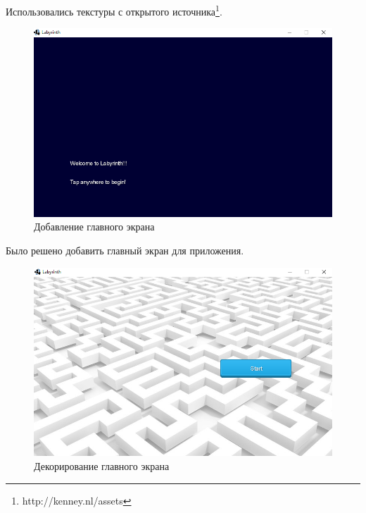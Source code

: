 Использовались текстуры с открытого источника\footnote{http://kenney.nl/assets}. 

\begin{figure}[H]
	\begin{center}
		\includegraphics[scale=0.7]{pics/04.png}
		\caption{Добавление главного экрана} 
		\label{pic:pic_name} %
	\end{center}
\end{figure}

Было решено добавить главный экран для приложения.

\begin{figure}[H]
	\begin{center}
		\includegraphics[scale=0.7]{pics/05.png}
		\caption{Декорирование главного экрана} 
		\label{pic:pic_name} %
	\end{center}
\end{figure}

